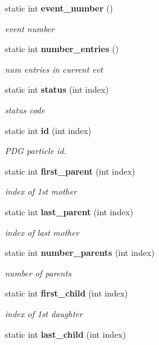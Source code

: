 \begin{CompactItemize}
static int {\bf event\_\-number} ()
\begin{CompactList}\small\item\em event number \item\end{CompactList}\item 
static int {\bf number\_\-entries} ()
\begin{CompactList}\small\item\em num entries in current evt \item\end{CompactList}\item 
static int {\bf status} (int index)
\begin{CompactList}\small\item\em status code \item\end{CompactList}\item 
static int {\bf id} (int index)
\begin{CompactList}\small\item\em PDG particle id. \item\end{CompactList}\item 
static int {\bf first\_\-parent} (int index)
\begin{CompactList}\small\item\em index of 1st mother \item\end{CompactList}\item 
static int {\bf last\_\-parent} (int index)
\begin{CompactList}\small\item\em index of last mother \item\end{CompactList}\item 
static int {\bf number\_\-parents} (int index)
\begin{CompactList}\small\item\em number of parents \item\end{CompactList}\item 
static int {\bf first\_\-child} (int index)
\begin{CompactList}\small\item\em index of 1st daughter \item\end{CompactList}\item 
static int {\bf last\_\-child} (int index)

\end{CompactItemize}
